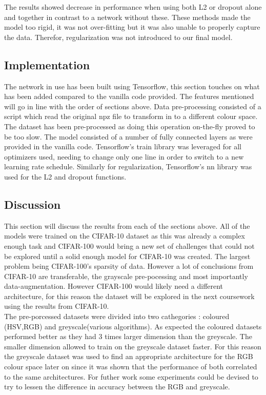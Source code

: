 \documentclass[12pt]{article}
\begin{document}
The results showed decrease in performance when using both L2 or dropout alone and together in contrast to a network without these. These methods made the model too rigid, it was not over-fitting but it was also unable to properly capture the data. Therefor, regularization was not introduced to our final model.

\subsection*{Implementation}

The network in use has been built using Tensorflow, this section touches on what has been added compared to the vanilla code provided. The features mentioned will go in line with the order of sections above. Data pre-processing consisted of a script which read the original npz file to transform in to a different colour space. The dataset has been pre-processed as doing this operation on-the-fly proved to be too slow.
The model consisted of a number of fully connected layers as were provided in the vanilla code. Tensorflow's train library was leveraged for all optimizers used, needing to change only one line in order to switch to a new learning rate schedule. Similarly for regularization, Tensorflow's nn library was used for the L2 and dropout functions.


\subsection*{Discussion}



This section will discuss the results from each of the sections above. All of the models were trained on the CIFAR-10 dataset as this was already a complex enough task and CIFAR-100 would bring a new set of challenges that could not be explored until a solid enough model for CIFAR-10 was created. The largest problem being CIFAR-100's sparsity of data. However a lot of conclusions from CIFAR-10 are transferable, the grayscale pre-pocessing and most importantly data-augmentation. However CIFAR-100 would likely need a different architecture, for this reason the dataset will be explored in the next coursework using the results from CIFAR-10.
\\


The pre-porcessed datasets were divided into two cathegories : coloured (HSV,RGB) and greyscale(various algorithms). As expected the coloured datasets performed better as they had 3 times larger dimension than the greyscale. The smaller dimension allowed to train on the greyscale dataset faster. For this reason the greyscale dataset was used to find an appropriate architecture for the RGB colour space later on since it was shown that the performance of both correlated to the same architectures. For futher work some experiments could be devised to try to lessen the difference in accuracy between the RGB and greyscale.
\\
\end{document}
